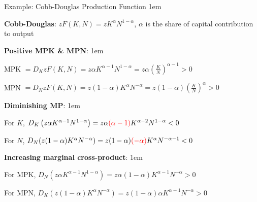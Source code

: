 \documentclass[11pt,aspectratio=43]{beamer}
\newcommand{\red}[1]{\textcolor{red}{#1}}
\let\olditemize=\itemize
\let\endolditemize=\enditemize
\renewenvironment{itemize}{\olditemize \itemsep1em}{\endolditemize}
\theoremstyle{definition}
\begin{document}
\begin{frame}{Example: Cobb-Douglas Production Function}
\label{slide:Example__Cobb_Douglas_Production_Function}
    \begin{itemize}
        \item \textbf{Cobb-Douglas}: $ z F( K, N ) = z K^{\alpha} N^{1-\alpha}$, $ \alpha $ is the share of capital contribution to output
        \item \textbf{Positive MPK \& MPN}:
        \begin{itemize}
            \item MPK $ = D_{K}z F( K, N ) = z \alpha K^{\alpha-1} N^{1-\alpha} = z \alpha \left( \frac{K}{N} \right)^{\alpha-1} > 0$
            \item MPN $ = D_{N}z F( K, N ) = z ( 1-\alpha ) K^{\alpha} N^{-\alpha} = z ( 1-\alpha ) \left( \frac{K}{N} \right)^{\alpha} > 0$
        \end{itemize}
        \item \textbf{Diminishing MP}:
        \begin{itemize}
            \item For $ K $, $ D_{K} \left( z \alpha K^{\alpha-1} N^{1-\alpha} \right) = z \alpha \red{( \alpha - 1 )} K^{\alpha - 2} N^{1-\alpha} < 0$
            \item For $ N $, $ D_{N} ( z ( 1-\alpha ) K^{\alpha} N^{-\alpha} ) = z ( 1-\alpha ) \red{( -\alpha )} K^{\alpha} N^{-\alpha-1} < 0$
        \end{itemize}
        \item \textbf{Increasing marginal cross-product}:
        \begin{itemize}
            \item For MPK, $ D_{N} ( z \alpha K^{\alpha-1} N^{1-\alpha} ) = z \alpha ( 1-\alpha ) K^{\alpha-1}N^{-\alpha} > 0$
            \item For MPN, $ D_{K} ( z ( 1-\alpha ) K^{\alpha} N^{-\alpha}  )  = z ( 1-\alpha ) \alpha K^{\alpha-1} N^{-\alpha} > 0$
        \end{itemize}
    \end{itemize}
\end{frame}
\end{document}
